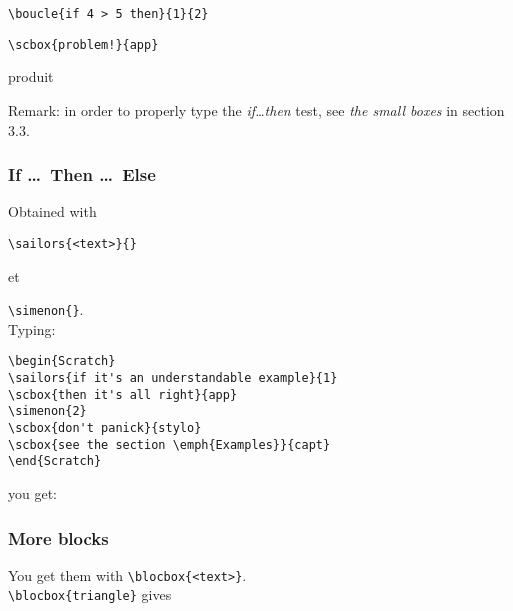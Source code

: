 \documentclass[a4paper,11pt]{article}
\begin{document}
\parbox{0.53\linewidth}{\texttt{\textbackslash boucle\{if 4 > 5 then\}\{1\}\{2\}}
\par
\texttt{\textbackslash scbox\{problem!\}\{app\}}
}
\parbox{0.12\linewidth}{produit}
\parbox{0.2\linewidth}{}

Remark: in order to properly type the \emph{if\dots then} test, see \emph{the small boxes} in section 3.3.

\subsubsection{If \dots\ Then \dots\ Else}%
Obtained with

\texttt{\textbackslash sailors\{<text>\}\{<number of blocks inside>\}}

et

\texttt{\textbackslash simenon\{<number of blocks inside>\}}.\\

Typing:
\begin{verbatim}
\begin{Scratch}
\sailors{if it's an understandable example}{1}
\scbox{then it's all right}{app}
\simenon{2}
\scbox{don't panick}{stylo}
\scbox{see the section \emph{Examples}}{capt}
\end{Scratch}
\end{verbatim}

you get:\\

\begin{Scratch}
\end{Scratch}

\subsubsection{More blocks}%

You get them with \texttt{\textbackslash blocbox\{<text>\}}.\\

\texttt{\textbackslash blocbox\{triangle\}} gives 
\end{document}
